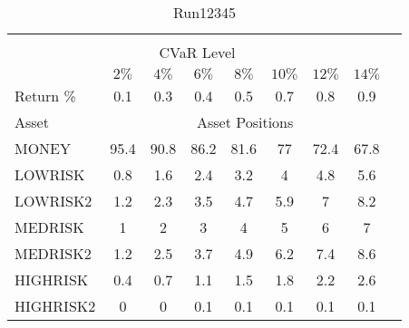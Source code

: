 \begin{table}[h!t]
\caption{Run12345}
\centering
\begin{tabular}[t]{ l c c c c c c c c }
\hline\hline \\
\multicolumn{8}{c}{CVaR Level} \\
 & $2\%$ & $4\%$ & $6\%$ & $8\%$ & $10\%$ & $12\%$ & $14\%$ \\[0.5ex]
Return \% &0.1 &0.3 &0.4 &0.5 &0.7 &0.8 &0.9\\[0.5ex]
Asset & \multicolumn{7}{c}{Asset Positions} \\[1ex]
MONEY & 95.4 & 90.8 & 86.2 & 81.6 & 77 & 72.4 & 67.8\\
LOWRISK & 0.8 & 1.6 & 2.4 & 3.2 & 4 & 4.8 & 5.6\\
LOWRISK2 & 1.2 & 2.3 & 3.5 & 4.7 & 5.9 & 7 & 8.2\\
MEDRISK & 1 & 2 & 3 & 4 & 5 & 6 & 7\\
MEDRISK2 & 1.2 & 2.5 & 3.7 & 4.9 & 6.2 & 7.4 & 8.6\\
HIGHRISK & 0.4 & 0.7 & 1.1 & 1.5 & 1.8 & 2.2 & 2.6\\
HIGHRISK2 & 0 & 0 & 0.1 & 0.1 & 0.1 & 0.1 & 0.1\\
[1ex] \hline
\end{tabular}
\end{table} 